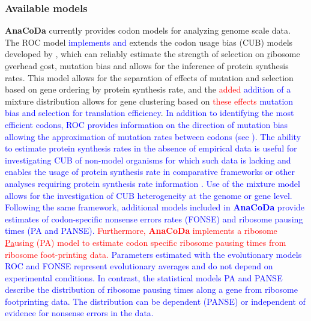 \documentclass{bioinfo}
\newcommand{\package}{\textbf{AnaCoDa }} %
\begin{document}
\subsubsection*{Available models}
\package currently provides codon models for analyzing genome scale data.
The ROC model \textcolor{blue}{implements and} extends the codon usage bias (CUB) models developed by \citet{gilchrist2015,wallace2013,shah2011}, which can reliably estimate the strength of selection on \underline{r}ibosome \underline{o}verhead \underline{c}ost, mutation bias and allows for the inference of protein synthesis rates.
This model allows for the separation of effects of mutation and selection based on gene ordering by protein synthesis rate, and the \textcolor{red}{added} \textcolor{blue}{addition of a} mixture distribution allows for gene clustering based on \textcolor{red}{these effects} \textcolor{blue}{mutation bias and selection for translation efficiency}.
\textcolor{blue}{
In addition to identifying the most efficient codons, ROC provides information on the direction of mutation bias allowing the approximation of mutation rates between codons (see \citet{gilchrist2015,wallace2013}).
The ability to estimate protein synthesis rates in the absence of empirical data is useful for investigating CUB of non-model organisms for which such data is lacking and enables the usage of protein synthesis rate in comparative frameworks or other analyses requiring protein synthesis rate information \citet{dunn2018}.
Use of the mixture model allows for the investigation of CUB heterogeneity at the genome or gene level.  
Following the same framework, additional models included in \package provide estimates of codon-specific nonsense errors rates (FONSE) and ribosome pausing times (PA and PANSE).
}
\textcolor{red}{
Furthermore, \package implements a ribosome \underline{Pa}using (PA) model to estimate codon specific ribosome pausing times from ribosome foot-printing data.
}
\textcolor{blue}{
Parameters estimated with the evolutionary models ROC and FONSE represent evolutionary averages and do not depend on experimental conditions. 
In contrast, the statistical models PA and PANSE describe the distribution of ribosome pausing times along a gene from ribosome footprinting data. 
The distribution can be dependent (PANSE) or independent of evidence for nonsense errors in the data.  
}



\end{document}
